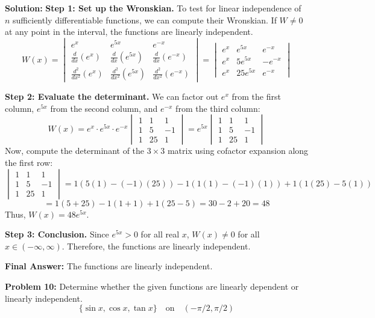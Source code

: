 \documentclass[11pt,letterpaper]{article}
\begin{document}
\textbf{Solution:}
\textbf{Step 1: Set up the Wronskian.}
To test for linear independence of $n$ sufficiently differentiable functions, we can compute their Wronskian. If $W \neq 0$ at any point in the interval, the functions are linearly independent.
\[ W(x) = \begin{vmatrix} e^x & e^{5x} & e^{-x} \\ \frac{d}{dx}(e^x) & \frac{d}{dx}(e^{5x}) & \frac{d}{dx}(e^{-x}) \\ \frac{d^2}{dx^2}(e^x) & \frac{d^2}{dx^2}(e^{5x}) & \frac{d^2}{dx^2}(e^{-x}) \end{vmatrix} = \begin{vmatrix} e^x & e^{5x} & e^{-x} \\ e^x & 5e^{5x} & -e^{-x} \\ e^x & 25e^{5x} & e^{-x} \end{vmatrix} \]

\textbf{Step 2: Evaluate the determinant.}
We can factor out $e^x$ from the first column, $e^{5x}$ from the second column, and $e^{-x}$ from the third column:
\[ W(x) = e^x \cdot e^{5x} \cdot e^{-x} \begin{vmatrix} 1 & 1 & 1 \\ 1 & 5 & -1 \\ 1 & 25 & 1 \end{vmatrix} = e^{5x} \begin{vmatrix} 1 & 1 & 1 \\ 1 & 5 & -1 \\ 1 & 25 & 1 \end{vmatrix} \]
Now, compute the determinant of the $3 \times 3$ matrix using cofactor expansion along the first row:
\[ \begin{vmatrix} 1 & 1 & 1 \\ 1 & 5 & -1 \\ 1 & 25 & 1 \end{vmatrix} = 1(5(1) - (-1)(25)) - 1(1(1) - (-1)(1)) + 1(1(25) - 5(1)) \]
\[ = 1(5 + 25) - 1(1 + 1) + 1(25 - 5) = 30 - 2 + 20 = 48 \]
Thus, $W(x) = 48e^{5x}$.

\textbf{Step 3: Conclusion.}
Since $e^{5x} > 0$ for all real $x$, $W(x) \neq 0$ for all $x \in (-\infty, \infty)$. Therefore, the functions are linearly independent.

\textbf{Final Answer:} The functions are linearly independent.

\vspace{0.5cm}

\textbf{Problem 10:} Determine whether the given functions are linearly dependent or linearly independent.
\[ \{\sin x, \cos x, \tan x\} \quad \text{on} \quad (-\pi/2, \pi/2) \]
\end{document}
